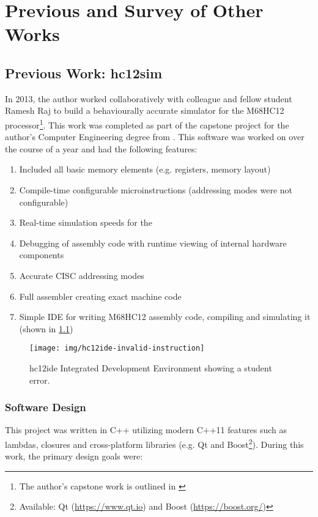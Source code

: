 \chapter{Previous and Survey of Other Works}
\label{ch:prev-other-work}

\section{Previous Work: hc12sim}

In 2013, the author worked collaboratively with colleague and fellow student Ramesh Raj to build a behaviourally accurate simulator for the M68HC12 processor\footnote{The author's capstone work is outlined in \cite{Brightwell2013}}. This work was completed as part of the capstone project for the author's Computer Engineering degree from \uwo{}. This software was worked on over the course of a year and had the following features: 

\begin{enumerate}
    \item Included all basic memory elements (e.g. registers, memory layout)
    \item Compile-time configurable microinstructions (addressing modes were not configurable)
    \item Real-time simulation speeds for the \hcmodel{}
    \item Debugging of assembly code with runtime viewing of internal hardware components
    \item Accurate CISC addressing modes 
    \item Full assembler creating exact machine code
    \item Simple IDE for writing M68HC12 assembly code, compiling and simulating it (shown in \cref{fig:hc12ide-invalid-instruction})
\end{enumerate}

\begin{figure}[!ht]
    \centering
    \texttt{[image: img/hc12ide-invalid-instruction]}
    \caption{hc12ide Integrated Development Environment showing a student error.}
    \label{fig:hc12ide-invalid-instruction}
\end{figure}

\subsection{Software Design}

This project was written in C++ utilizing modern C++11 features such as lambdas, closures and cross-platform libraries (e.g. Qt and Boost\footnote{Available: Qt (\url{https://www.qt.io}) and Boost (\url{https://boost.org/})}). During this work, the primary design goals were: 


